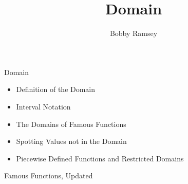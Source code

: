 \documentclass{ximera}
\author{Bobby Ramsey}
\title{Domain}
\begin{document}
\begin{abstract}
\end{abstract}
\maketitle


\begin{objectives}

\item Domain
\begin{itemize}
	\item Definition of the Domain
	\item Interval Notation 
	\item The Domains of Famous Functions 
	\item Spotting Values not in the Domain
	\item Piecewise Defined Functions and Restricted Domains 
\end{itemize}

\item Famous Functions, Updated



\end{objectives}
\end{document}
